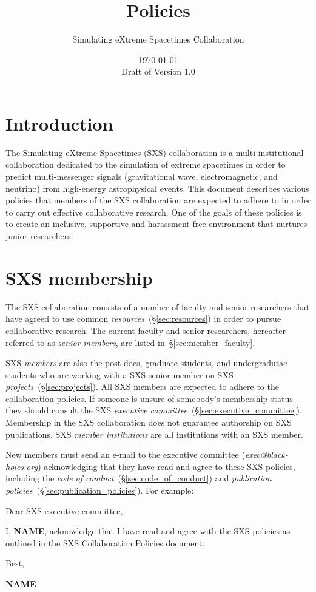 \documentclass[12pt]{article}
\author{Simulating eXtreme Spacetimes Collaboration}
\date{\today \\Draft of Version 1.0}
\title{Policies}
\begin{document}
\maketitle
\section{Introduction}

The Simulating eXtreme Spacetimes (SXS) collaboration is a
multi-institutional collaboration dedicated to the simulation of
extreme spacetimes in order to predict multi-messenger signals
(gravitational wave, electromagnetic, and neutrino) from high-energy
astrophysical events.  This document describes various policies that
members of the SXS collaboration are expected to adhere to in order to
carry out effective collaborative research.  One of the goals of these
policies is to create an inclusive, supportive and harassment-free
environment that nurtures junior researchers.

\section{SXS membership}\label{sec:sxs_membership}

The SXS collaboration consists of a number of faculty and senior
researchers that have agreed to use common
\emph{resources}~(\S\ref{sec:resources}) in order to pursue
collaborative research.  The current faculty and senior researchers,
hereafter referred to as \emph{senior members}, are listed
in~\S\ref{sec:member_faculty}.

SXS \emph{members} are also the post-docs, graduate students, and
undergradutae students who are working with a SXS senior member on SXS
\emph{projects}~(\S\ref{sec:projects}).  All SXS members are expected
to adhere to the collaboration policies.  If someone is unsure of
somebody's membership status they should consult the SXS
\emph{executive committee}~(\S\ref{sec:executive_committee}).
Membership in the SXS collaboration does not guarantee authorship on
SXS publications.  SXS \emph{member institutions} are all institutions
with an SXS member.

New members must send an e-mail to the executive committee
(\emph{exec@black-holes.org}) acknowledging that they have read and
agree to these SXS policies, including the \emph{code of
  conduct}~(\S\ref{sec:code_of_conduct}) and \emph{publication
  policies}~(\S\ref{sec:publication_policies}).  For example:

\begin{displayquote}
  Dear SXS executive committee,

  I, \textbf{NAME}, acknowledge that I have read and agree with the
  SXS policies as outlined in the SXS Collaboration Policies
  document.

  Best,

  \textbf{NAME}
\end{displayquote}
\end{document}

